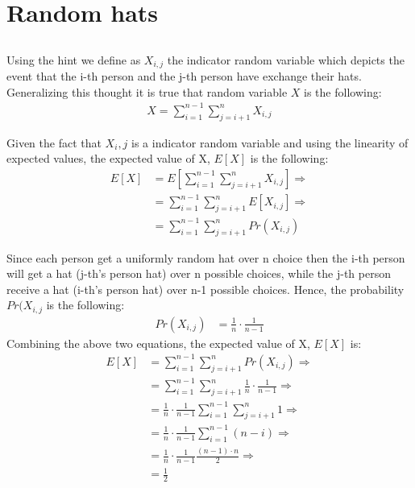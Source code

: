 \documentclass[11pt]{537homework}
\author{Emmanouil Kritharakis}
\begin{document}
\section{Random hats}


\subsection{}
Using the hint we define as $X_{i,j}$ the indicator random variable which depicts the event that the i-th person and the j-th person have exchange their hats. Generalizing this thought it is true that random variable $X$ is the following:\\
\begingroup
\allowdisplaybreaks
\begin{align*}
 X = \sum_{i=1}^{n-1} \sum_{j=i+1}^{n} X_{i,j}
\end{align*}
\endgroup

Given the fact that $X_i,j$ is a indicator random variable and using the linearity of expected values, the expected value of X, $E[X]$ is the following:
\begingroup
\allowdisplaybreaks
\begin{align*}
 E[X] &= E[ \sum_{i=1}^{n-1} \sum_{j=i+1}^{n} X_{i,j}] \Longrightarrow \\
      &= \sum_{i=1}^{n-1} \sum_{j=i+1}^{n} E[X_{i,j}] \Longrightarrow \\
      &= \sum_{i=1}^{n-1} \sum_{j=i+1}^{n} Pr(X_{i,j}) 
\end{align*}
\endgroup

Since each person get a uniformly random hat over n choice then the i-th person will get a hat (j-th's person hat) over n possible choices, while the j-th person receive a hat (i-th's person hat) over n-1 possible choices. Hence, the probability $Pr(X_{i,j}$ is the following: 
\begingroup
\allowdisplaybreaks
\begin{align*}
Pr(X_{i,j}) &= \frac{1}{n} \cdot \frac{1}{n-1}  
\end{align*}
\endgroup
Combining the above two equations, the expected value of X, $E[X]$ is:
\begingroup
\allowdisplaybreaks
\begin{align*}
 E[X] &= \sum_{i=1}^{n-1} \sum_{j=i+1}^{n} Pr(X_{i,j}) \Longrightarrow \\
      &= \sum_{i=1}^{n-1} \sum_{j=i+1}^{n} \frac{1}{n} \cdot \frac{1}{n-1}   \Longrightarrow \\
      &= \frac{1}{n} \cdot \frac{1}{n-1}  \sum_{i=1}^{n-1} \sum_{j=i+1}^{n} 1   \Longrightarrow \\
      &= \frac{1}{n} \cdot \frac{1}{n-1}  \sum_{i=1}^{n-1} (n-i)   \Longrightarrow \\
      &= \frac{1}{n} \cdot \frac{1}{n-1}  \frac{(n-1)\cdot n}{2}   \Longrightarrow \\
      &= \frac{1}{2}
\end{align*}
\endgroup
\end{document}
